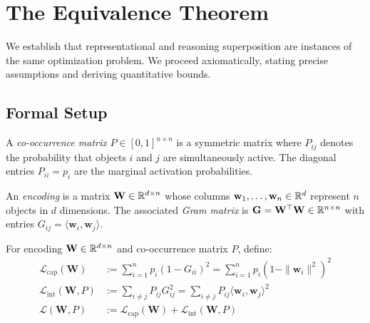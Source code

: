 \section{The Equivalence Theorem}
\label{sec:equivalence}

We establish that representational and reasoning superposition are instances of the same optimization problem. We proceed axiomatically, stating precise assumptions and deriving quantitative bounds.

\subsection{Formal Setup}

\begin{definition}
\label{def:cooccur}
A \emph{co-occurrence matrix} $P \in [0,1]^{n \times n}$ is a symmetric matrix where $P_{ij}$ denotes the probability that objects $i$ and $j$ are simultaneously active. The diagonal entries $P_{ii} = p_i$ are the marginal activation probabilities.
\end{definition}

\begin{definition}
\label{def:encoding}
An \emph{encoding} is a matrix $\mathbf{W} \in \mathbb{R}^{d \times n}$ whose columns $\mathbf{w}_1, \ldots, \mathbf{w}_n \in \mathbb{R}^d$ represent $n$ objects in $d$ dimensions. The associated \emph{Gram matrix} is $\mathbf{G} = \mathbf{W}^\top \mathbf{W} \in \mathbb{R}^{n \times n}$ with entries $G_{ij} = \langle \mathbf{w}_i, \mathbf{w}_j \rangle$.
\end{definition}

\begin{definition}
\label{def:super_loss}
For encoding $\mathbf{W} \in \mathbb{R}^{d \times n}$ and co-occurrence matrix $P$, define:
\begin{align}
\mathcal{L}_{\text{cap}}(\mathbf{W}) &:= \sum_{i=1}^{n} p_i \left(1 - G_{ii}\right)^2 = \sum_{i=1}^{n} p_i \left(1 - \|\mathbf{w}_i\|^2\right)^2 \label{eq:cap_loss}\\
\mathcal{L}_{\text{int}}(\mathbf{W}, P) &:= \sum_{i \neq j} P_{ij} G_{ij}^2 = \sum_{i \neq j} P_{ij} \langle \mathbf{w}_i, \mathbf{w}_j \rangle^2 \label{eq:int_loss}\\
\mathcal{L}(\mathbf{W}, P) &:= \mathcal{L}_{\text{cap}}(\mathbf{W}) + \mathcal{L}_{\text{int}}(\mathbf{W}, P) \label{eq:unified_loss}
\end{align}
\end{definition}

